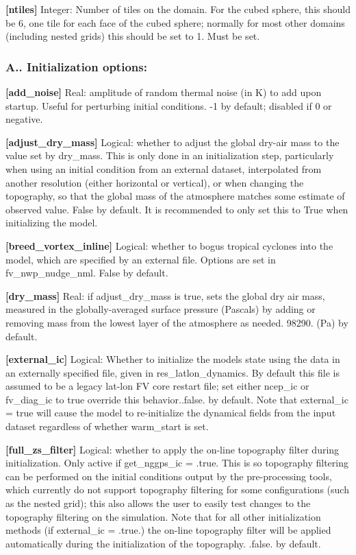 {\bfseries \mbox{[}ntiles\mbox{]}} Integer\+: Number of tiles on the domain. For the cubed sphere, this should be 6, one tile for each face of the cubed sphere; normally for most other domains (including nested grids) this should be set to 1. Must be set.

\subsubsection*{A.. Initialization options\+:}

{\bfseries \mbox{[}add\+\_\+noise\mbox{]}} Real\+: amplitude of random thermal noise (in K) to add upon startup. Useful for perturbing initial conditions. -\/1 by default; disabled if 0 or negative.

{\bfseries \mbox{[}adjust\+\_\+dry\+\_\+mass\mbox{]}} Logical\+: whether to adjust the global dry-\/air mass to the value set by dry\+\_\+mass. This is only done in an initialization step, particularly when using an initial condition from an external dataset, interpolated from another resolution (either horizontal or vertical), or when changing the topography, so that the global mass of the atmosphere matches some estimate of observed value. False by default. It is recommended to only set this to True when initializing the model.

{\bfseries \mbox{[}breed\+\_\+vortex\+\_\+inline\mbox{]}} Logical\+: whether to bogus tropical cyclones into the model, which are specified by an external file. Options are set in fv\+\_\+nwp\+\_\+nudge\+\_\+nml. False by default.

{\bfseries \mbox{[}dry\+\_\+mass\mbox{]}} Real\+: if adjust\+\_\+dry\+\_\+mass is true, sets the global dry air mass, measured in the globally-\/averaged surface pressure (Pascals) by adding or removing mass from the lowest layer of the atmosphere as needed. 98290. (Pa) by default.

{\bfseries \mbox{[}external\+\_\+ic\mbox{]}} Logical\+: Whether to initialize the models state using the data in an externally specified file, given in res\+\_\+latlon\+\_\+dynamics. By default this file is assumed to be a legacy lat-\/lon FV core restart file; set either ncep\+\_\+ic or fv\+\_\+diag\+\_\+ic to true override this behavior..false. by default. Note that external\+\_\+ic = true will cause the model to re-\/initialize the dynamical fields from the input dataset regardless of whether warm\+\_\+start is set.

{\bfseries \mbox{[}full\+\_\+zs\+\_\+filter\mbox{]}} Logical\+: whether to apply the on-\/line topography filter during initialization. Only active if get\+\_\+nggps\+\_\+ic = .true. This is so topography filtering can be performed on the initial conditions output by the pre-\/processing tools, which currently do not support topography filtering for some configurations (such as the nested grid); this also allows the user to easily test changes to the topography filtering on the simulation. Note that for all other initialization methods (if external\+\_\+ic = .true.) the on-\/line topography filter will be applied automatically during the initialization of the topography. .false. by default.

